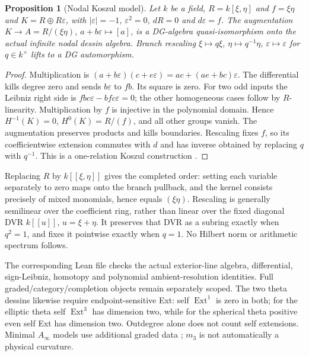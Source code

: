 \documentclass[11pt,oneside,openany]{book}
\newtheorem{proposition}[theorem]{Proposition}
\theoremstyle{definition}\newtheorem{definition}[theorem]{Definition}
\theoremstyle{remark}\newtheorem{remark}[theorem]{Remark}
\begin{document}
\begin{proposition}[Nodal Koszul model]\label{thm:nodal-dg}
Let $k$ be a field, $R=k[\xi,\eta]$ and $f=\xi\eta$ and $K=R\oplus R\varepsilon$, with
$|\varepsilon|=-1$, $\varepsilon^2=0$, $dR=0$ and $d\varepsilon=f$.
The augmentation $K\to A=R/(\xi\eta)$, $a+b\varepsilon\mapsto[a]$,
is a DG-algebra quasi-isomorphism onto the actual infinite nodal dessin
algebra. Branch rescaling $\xi\mapsto q\xi$, $\eta\mapsto q^{-1}\eta$,
$\varepsilon\mapsto\varepsilon$ for $q\in k^\times$ lifts to a DG automorphism.
\end{proposition}
\begin{proof}
Multiplication is $(a+b\varepsilon)(c+e\varepsilon)=ac+(ae+bc)\varepsilon$.
The differential kills degree zero and sends $b\varepsilon$ to $fb$.
Its square is zero. For two odd inputs the Leibniz right side is
$fbc\varepsilon-bfc\varepsilon=0$; the other homogeneous cases follow
by $R$-linearity. Multiplication by $f$ is injective in the polynomial
domain. Hence $H^{-1}(K)=0$, $H^0(K)=R/(f)$, and all other groups vanish.
The augmentation preserves products and kills boundaries. Rescaling fixes
$f$, so its coefficientwise extension commutes with $d$ and has inverse
obtained by replacing $q$ with $q^{-1}$. This is a one-relation Koszul
construction \cite{StacksKoszulDG,StacksKoszulRegular}.
\end{proof}
Replacing $R$ by $k[[\xi,\eta]]$ gives the completed order: setting each
variable separately to zero maps onto the branch pullback, and the kernel
consists precisely of mixed monomials, hence equals $(\xi\eta)$.
Rescaling is generally semilinear over the coefficient ring, rather than
linear over the fixed diagonal DVR $k[[u]]$, $u=\xi+\eta$.
It preserves that DVR as a subring exactly when $q^2=1$, and fixes it
pointwise exactly when $q=1$. No Hilbert norm or arithmetic spectrum follows.

The corresponding Lean file checks the actual exterior-line algebra,
differential, sign-Leibniz, homotopy and polynomial ambient-resolution
identities. Full graded/category/completion objects remain separately scoped.
The two theta dessins likewise require endpoint-sensitive Ext: self
$\operatorname{Ext}^1$ is zero in both; for the elliptic theta self
$\operatorname{Ext}^3$ has dimension two, while for the spherical theta
positive even self Ext has dimension two. Outdegree alone does not count
self extensions. Minimal $A_\infty$ models use additional graded data
\cite[\S3.3]{KellerAinf}; $m_3$ is not automatically a physical curvature.
\end{document}
